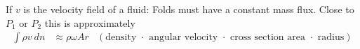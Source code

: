 If $v$ is the velocity field of a fluid: Folds must have a constant mass flux. Close to $P_1$ or $P_2$ this is approximately
\begin{align*}
    \int \rho v\ dn &\approx \rho \omega A r &(\text{density $\cdot$ angular velocity $\cdot$ cross section area $\cdot$ radius})
\end{align*}


























